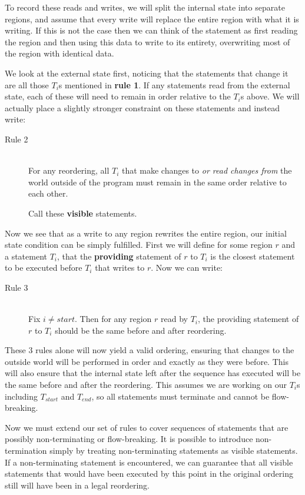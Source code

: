 \documentclass[twoside,a4paper]{report}
\begin{document}
To record these reads and writes, we
will split the internal state into separate regions, and assume that every write will replace the entire region with what it is writing. If this is not
the case then we can think of the statement as first reading the region and then using this data to write to its entirety, overwriting most of the region
with identical data.

We look at the external state first, noticing that the statements that change it are all those $T_i$s mentioned in \textbf{rule 1}. If any statements
read from the external state, each of these will need to remain in order relative to the $T_i$s above. We will actually place a slightly stronger constraint on these
statements and instead write:

\begin{description}
\item[Rule 2] \hfill \\
For any reordering, all $T_i$ that make changes to \textit{or read changes from} the world outside of the program must remain in the same order
relative to each other.

Call these \textbf{visible} statements.
\end{description}

Now we see that as a write to any region rewrites the entire region, our initial state condition can be simply fulfilled. First we will define for some region
$r$ and a statement $T_i$, that the \textbf{providing} statement of $r$ to $T_i$ is the closest statement to be executed before $T_i$ that writes to $r$. Now
we can write:

\begin{description}
\item[Rule 3] \hfill \\
Fix $i \ne {start}$. Then for any region $r$ read by $T_i$, the providing statement of $r$ to $T_i$ should be the same before and after reordering.
\end{description}

These 3 rules alone will now yield a valid ordering, ensuring that changes to the outside world will be performed in order and exactly as they were before.
This will also ensure that the internal state left after the sequence has executed will be the same before and after the reordering. This assumes we are working
on our $T_i$s including $T_{start}$ and $T_{end}$, so all statements must terminate and cannot be flow-breaking.

Now we must extend our set of rules to cover sequences of statements that are possibly non-terminating or flow-breaking. It is possible to introduce non-termination
simply by treating non-terminating statements as visible statements. If a non-terminating statement is encountered, we can guarantee that all visible statements that
would have been executed by this point in the original ordering still will have been in a legal reordering.
\end{document}
